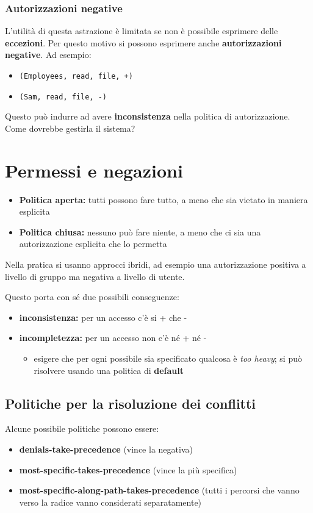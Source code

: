\documentclass{report}
\begin{document}
\subsubsection{Autorizzazioni negative}

\noindent L'utilità di questa astrazione è limitata se non è possibile esprimere 
delle \textbf{eccezioni}. Per questo motivo si possono esprimere anche \textbf{autorizzazioni 
negative}. Ad esempio:
\begin{itemize}
    \item \texttt{(Employees, read, file, +)}
    \item \texttt{(Sam, read, file, -)}
\end{itemize}

\noindent Questo può indurre ad avere \textbf{inconsistenza} nella politica di autorizzazione. Come
dovrebbe gestirla il sistema?

\section{Permessi e negazioni}
\begin{itemize}
    \item \textbf{Politica aperta:} tutti possono fare tutto, a meno che sia vietato in maniera esplicita 
    \item \textbf{Politica chiusa:} nessuno può fare niente, a meno che ci sia una autorizzazione esplicita che lo permetta
\end{itemize}

\noindent Nella pratica si usanno approcci ibridi, ad esempio una autorizzazione 
positiva a livello di gruppo ma negativa a livello di utente. 

\noindent Questo porta con sé due possibili conseguenze:
\begin{itemize}
    \item \textbf{inconsistenza:} per un accesso c'è si + che - 
    \item \textbf{incompletezza:} per un accesso non c'è né + né -
    \begin{itemize}
        \item esigere che per ogni possibile sia specificato qualcosa è \textit{too heavy}; si 
        può risolvere usando una politica di \textbf{default}
    \end{itemize}
\end{itemize}

\subsection{Politiche per la risoluzione dei conflitti}
Alcune possibile politiche possono essere:
\begin{itemize}
    \item \textbf{denials-take-precedence} (vince la negativa)
    \item \textbf{most-specific-takes-precedence} (vince la più specifica)
    \item \textbf{most-specific-along-path-takes-precedence} (tutti i percorsi che vanno verso 
    la radice vanno considerati separatamente)
\end{itemize}
\end{document}
